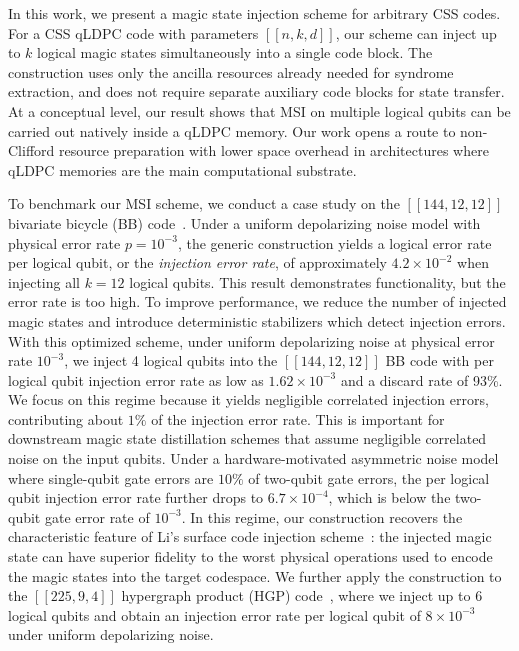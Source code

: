 In this work, we present a magic state injection scheme for arbitrary CSS codes. 
For a CSS qLDPC code with parameters $[[n,k,d]]$, our scheme can inject up to $k$ logical magic states simultaneously into a single code block. The construction uses only the ancilla resources already needed for syndrome extraction, and does not require separate auxiliary code blocks for state transfer. 
At a conceptual level, our result shows that MSI on multiple logical qubits can be carried out natively inside a qLDPC memory. Our work opens a route to non-Clifford resource preparation with lower space overhead in architectures where qLDPC memories are the main computational substrate.

To benchmark our MSI scheme, we conduct a case study on the $[[144,12,12]]$ bivariate bicycle (BB) code~\cite{bravyi_high-threshold_2024}.
Under a uniform depolarizing noise model with physical error rate $p=10^{-3}$, the generic construction yields a logical error rate per logical qubit, or the \emph{injection error rate}, of approximately $4.2 \times 10^{-2}$ when injecting all $k=12$ logical qubits.
This result demonstrates functionality, but the error rate is too high.
To improve performance, we reduce the number of injected magic states and introduce deterministic stabilizers which detect injection errors.
With this optimized scheme, under uniform depolarizing noise at physical error rate $10^{-3}$, we inject 4 logical qubits into the $[[144,12,12]]$ BB code with per logical qubit injection error rate as low as $1.62\times 10^{-3}$ and a discard rate of 93\%. 
We focus on this regime because it yields negligible correlated injection errors, contributing about $ 1\% $ of the injection error rate.
This is important for downstream magic state distillation schemes that assume negligible correlated noise on the input qubits.
Under a hardware-motivated asymmetric noise model where single-qubit gate errors are $10\%$ of two-qubit gate errors, the per logical qubit injection error rate further drops to $6.7\times 10^{-4}$, which is below the two-qubit gate error rate of $10^{-3}$. In this regime, our construction recovers the characteristic feature of Li's surface code injection scheme~\cite{li_magic_2015}: the injected magic state can have superior fidelity to the worst physical operations used to encode the magic states into the target codespace. We further apply the construction to the $[[225,9,4]]$ hypergraph product (HGP) code~\cite{xu_constant-overhead_2023}, where we inject up to 6 logical qubits and obtain an injection error rate per logical qubit of $8 \times 10^{-3}$ under uniform depolarizing noise.

